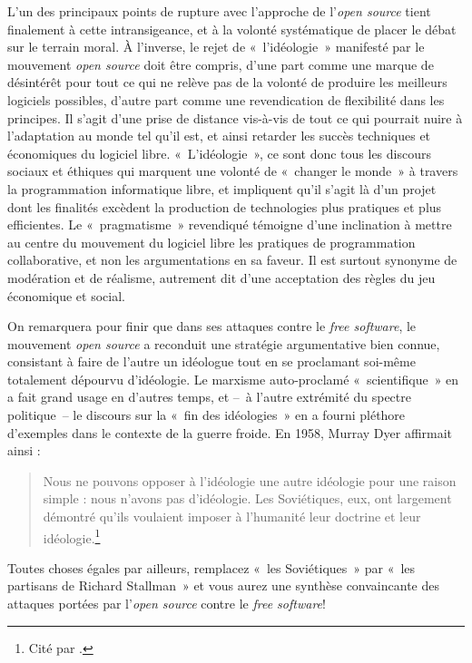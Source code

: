 \documentclass{FramateX}
\begin{document}
\begin{refsection}
L'un des principaux points de rupture avec l'approche
de l'\textit{open source} tient finalement à cette intransigeance, et à
la volonté systématique de placer le débat sur le terrain moral. À
l'inverse, le rejet de «~l'idéologie~» manifesté par
le mouvement \textit{open source} doit être compris, d'une part comme
une marque de désintérêt pour tout ce qui ne relève pas de la volonté
de produire les meilleurs logiciels possibles, d'autre
part comme une revendication de flexibilité dans les principes. Il
s'agit d'une prise de distance vis-à-vis de tout ce qui pourrait nuire
à l'adaptation au monde tel qu'il est, et ainsi retarder les succès
techniques et économiques du logiciel libre. «~L'idéologie~», ce sont
donc tous les discours sociaux et éthiques qui marquent une volonté de
«~changer le monde~» à travers la programmation informatique libre, et
impliquent qu'il s'agit là d'un projet dont les finalités excèdent la
production de technologies plus pratiques et plus efficientes. Le
«~pragmatisme~» revendiqué témoigne d'une inclination à mettre au
centre du mouvement du logiciel libre les pratiques de programmation
collaborative, et non les argumentations en sa faveur. Il est
surtout synonyme de modération et de réalisme, autrement dit d'une
acceptation des règles du jeu économique et social. 

On remarquera pour finir que dans ses attaques contre le \textit{free
software}, le mouvement \textit{open source} a reconduit une stratégie
argumentative bien connue, consistant à faire de l'autre un
idéologue tout en se proclamant soi-même totalement dépourvu
d'idéologie. Le marxisme auto-proclamé «~scientifique~» en a fait grand
usage en d'autres temps, et –~à
l'autre extrémité du spectre politique~– le discours
sur la «~fin des idéologies~» en a fourni pléthore d'exemples dans le
contexte de la guerre froide. En 1958, Murray Dyer affirmait ainsi :


\begin{quote}
Nous ne pouvons opposer à l'idéologie une autre idéologie pour
une raison simple : nous n'avons pas d'idéologie. Les Soviétiques, eux,
ont largement démontré qu'ils voulaient imposer à l'humanité leur
doctrine et leur idéologie.\footnote{Cité par \cite[p.~305]{mattelarthistoire2009}.}
\end{quote}

Toutes choses égales par ailleurs, remplacez «~les Soviétiques~» par
«~les partisans de Richard Stallman~» et vous aurez une synthèse
convaincante des attaques portées par l'\textit{open source} contre le
\textit{free software}!





\end{refsection}
\end{document}
